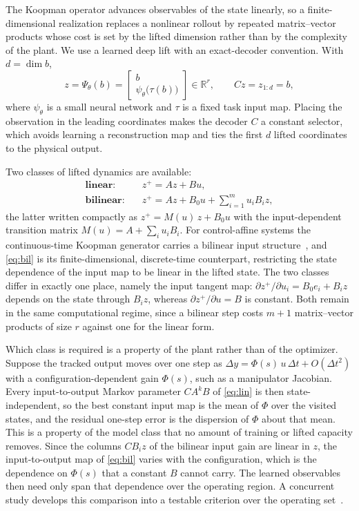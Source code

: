 \documentclass[letterpaper,10pt,conference]{ieeeconf}
\begin{document}
The Koopman operator advances observables of the state linearly, so a finite-dimensional realization replaces a nonlinear rollout by repeated matrix--vector products whose cost is set by the lifted dimension rather than by the complexity of the plant.
We use a learned deep lift with an exact-decoder convention. With $d = \dim b$,
\begin{equation}
z = \Psi_\theta(b) =
\begin{bmatrix} b \\ \psi_\theta\big(\tau(b)\big) \end{bmatrix}
\in \mathbb{R}^{r},
\qquad
C z = z_{1:d} = b,
\label{eq:lift}
\end{equation}
where $\psi_\theta$ is a small neural network and $\tau$ is a fixed task input map.
Placing the observation in the leading coordinates makes the decoder $C$ a constant selector, which avoids learning a reconstruction map and ties the first $d$ lifted coordinates to the physical output.

Two classes of lifted dynamics are available:
\begin{align}
\textbf{linear:}\quad
& z^{+} = A z + B u ,
\label{eq:lin}\\[2pt]
\textbf{bilinear:}\quad
& z^{+} = A z + B_0 u + \sum_{i=1}^{m} u_i B_i z ,
\label{eq:bil}
\end{align}
the latter written compactly as $z^{+} = M(u)\, z + B_0 u$ with the input-dependent transition matrix $M(u) = A + \sum_i u_i B_i$.
For control-affine systems the continuous-time Koopman generator carries a bilinear input structure~\cite{iacob2024}, and \eqref{eq:bil} is its finite-dimensional, discrete-time counterpart, restricting the state dependence of the input map to be linear in the lifted state.
The two classes differ in exactly one place, namely the input tangent map: $\partial z^{+} / \partial u_i = B_0 e_i + B_i z$ depends on the state through $B_i z$, whereas $\partial z^{+}/\partial u = B$ is constant.
Both remain in the same computational regime, since a bilinear step costs $m+1$ matrix--vector products of size $r$ against one for the linear form.

Which class is required is a property of the plant rather than of the optimizer.
Suppose the tracked output moves over one step as $\Delta y = \Phi(s)\, u\, \Delta t + O(\Delta t^{2})$ with a configuration-dependent gain $\Phi(s)$, such as a manipulator Jacobian.
Every input-to-output Markov parameter $C A^{k} B$ of \eqref{eq:lin} is then state-independent, so the best constant input map is the mean of $\Phi$ over the visited states, and the residual one-step error is the dispersion of $\Phi$ about that mean.
This is a property of the model class that no amount of training or lifted capacity removes.
Since the columns $C B_i z$ of the bilinear input gain are linear in $z$, the input-to-output map of \eqref{eq:bil} varies with the configuration, which is the dependence on $\Phi(s)$ that a constant $B$ cannot carry.
The learned observables then need only span that dependence over the operating region.
A concurrent study develops this comparison into a testable criterion over the operating set~\cite{kim2026bilinear}.
\end{document}

